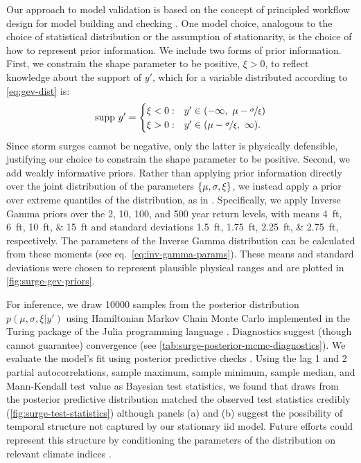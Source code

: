 \documentclass[11pt]{article}
\begin{document}
Our approach to model validation is based on the concept of principled workflow design for model building and checking \citep[see][for details]{gelman_workflow:2020}.
One model choice, analogous to the choice of statistical distribution or the assumption of stationarity, is the choice of how to represent prior information.
We include two forms of prior information.
First, we constrain the shape parameter to be positive, $\xi > 0$, to reflect knowledge about the support of $y'$, which for a variable distributed according to \cref{eq:gev-dist} is:
\begin{equation*}
    \mathrm{supp}~ y' =
    \begin{cases}
        \xi < 0: & y' \in \qty(-\infty,~ \mu - \nicefrac{\sigma}{\xi}) \\
        \xi > 0: & y' \in \qty(\mu-\nicefrac{\sigma}{\xi},~ \infty).
    \end{cases}
\end{equation*}
Since storm surges cannot be negative, only the latter is physically defensible, justifying our choice to constrain the shape parameter to be positive.
Second, we add weakly informative priors.
Rather than applying prior information directly over the joint distribution of the parameters $\qty{\mu,\sigma,\xi}$, we instead apply a prior over extreme quantiles of the distribution, as in \citet{coles_evd:1996}.
Specifically, we apply Inverse Gamma priors over the 2, 10, 100, and 500 year return levels, with means \SIlist{4;6;10;15}{ft} and standard deviations \SIlist{1.5;1.75;2.25;2.75}{ft}, respectively.
The parameters of the Inverse Gamma distribution can be calculated from these moments (see eq.~\ref{eq:inv-gamma-params}).
These means and standard deviations were chosen to represent plausible physical ranges and are plotted in \cref{fig:surge-gev-priors}.

For inference, we draw \num{10000} samples from the posterior distribution $p(\mu,\sigma,\xi | y')$ using Hamiltonian Markov Chain Monte Carlo \citep{Betancourt:2017vd,hoffman_nuts:2011} implemented in the Turing package of the Julia programming language \citep{perkel_julia:2019,ge_turing:2018,tarek_dynamicppl:2020,besancon_distributions.jl:2021,bezanson_julia:2012}.
Diagnostics suggest (though cannot guarantee) convergence (see \cref{tab:surge-posterior-mcmc-diagnostics}).
We evaluate the model's fit using posterior predictive checks \citep[see][section 2.4 and references therein]{gelman_workflow:2020}.
Using the lag 1 and 2 partial autocorrelations, sample maximum, sample minimum, sample median, and Mann-Kendall test value as Bayesian test statistics, we found that draws from the posterior predictive distribution matched the observed test statistics credibly (\cref{fig:surge-test-statistics}) although panels (a) and (b) suggest the possibility of temporal structure not captured by our stationary \gls{iid} model.
Future efforts could represent this structure by conditioning the parameters of the distribution on relevant climate indices \citep[as in][]{wong_structural:2020,farnham_orbrep:2018,farnham_jetstream:2017,ossandon_semibayesian:2021}.
\end{document}
